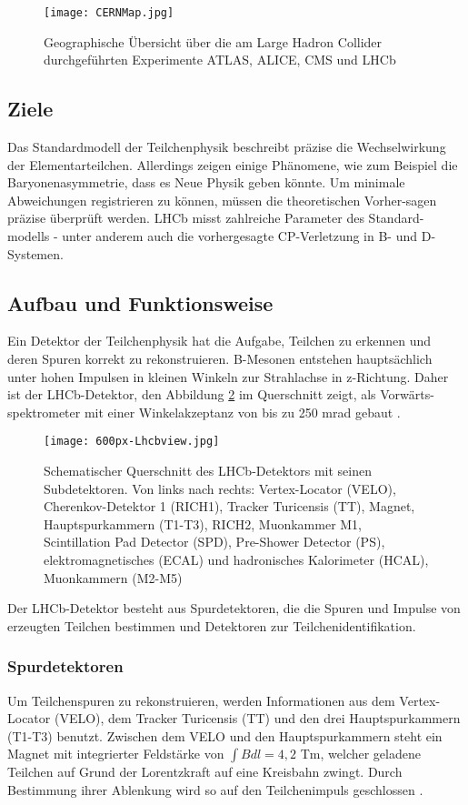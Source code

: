 \documentclass{article}
\begin{document}
\begin{figure}[h!]
	\centering
  \texttt{[image: CERNMap.jpg]}
	\caption{Geographische Übersicht über die am Large Hadron Collider durchgeführten Experimente ATLAS, ALICE, CMS und LHCb \cite{cernmap}}
\label{mapcern}
\end{figure}

\subsection{Ziele}
Das Standardmodell der Teilchenphysik beschreibt präzise die Wechselwirkung der Elementarteilchen. Allerdings zeigen einige Phänomene, wie zum Beispiel die Baryonenasymmetrie, dass es Neue Physik geben könnte. Um minimale Abweichungen registrieren zu können, müssen die theoretischen Vorher-sagen präzise überprüft werden. 
LHCb misst zahlreiche Parameter des Standard-modells - unter anderem auch die vorhergesagte CP-Verletzung in B- und D-Systemen.


\subsection{Aufbau und Funktionsweise}
Ein Detektor der Teilchenphysik hat die Aufgabe, Teilchen zu erkennen und deren Spuren korrekt zu rekonstruieren. B-Mesonen entstehen hauptsächlich unter hohen Impulsen in kleinen Winkeln zur Strahlachse in z-Richtung. Daher ist der LHCb-Detektor, den Abbildung \ref{lhcbforward} im Querschnitt zeigt, als Vorwärts-spektrometer mit einer Winkelakzeptanz von bis zu 250 mrad gebaut \cite{SISSA2008}. 

\begin{figure}[h!]
	\centering
  \texttt{[image: 600px-Lhcbview.jpg]}
\label{lhcbforward}
	\caption{Schematischer Querschnitt des LHCb-Detektors mit seinen Subdetektoren. Von links nach rechts: Vertex-Locator (VELO), Cherenkov-Detektor 1 (RICH1), Tracker Turicensis (TT), Magnet, Hauptspurkammern (T1-T3), RICH2, Muonkammer M1, Scintillation Pad Detector (SPD), Pre-Shower Detector (PS), elektromagnetisches (ECAL) und hadronisches Kalorimeter (HCAL), Muonkammern (M2-M5) \cite{lhcbview}}
\end{figure}

Der LHCb-Detektor besteht aus Spurdetektoren, die die Spuren und Impulse von erzeugten Teilchen bestimmen und Detektoren zur Teilchenidentifikation. 

\subsubsection{Spurdetektoren}
Um Teilchenspuren zu rekonstruieren, werden Informationen aus dem Vertex-Locator (VELO), dem Tracker Turicensis (TT) und den drei Hauptspurkammern (T1-T3) benutzt. Zwischen dem VELO und den Hauptspurkammern steht ein Magnet mit integrierter Feldstärke von $\int Bdl = 4,2$ Tm, welcher geladene Teilchen auf Grund der Lorentzkraft auf eine Kreisbahn zwingt. Durch Bestimmung ihrer Ablenkung wird so auf den Teilchenimpuls geschlossen \cite{SISSA2008}.
\end{document}
